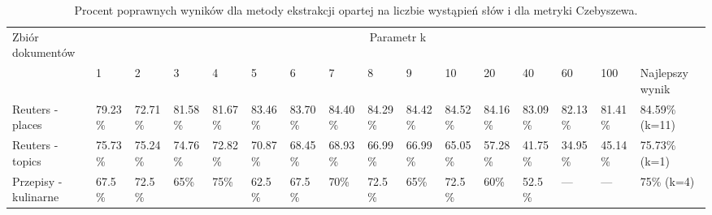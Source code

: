 \documentclass{classrep}
\begin{document}
\begingroup
{\scriptsize  
\setlength{\LTleft}{-20cm plus -1fill}
\setlength{\LTright}{\LTleft}

\begin{longtable}{|p{1cm}|p{0.7cm}|p{0.7cm}|p{0.7cm}|p{0.7cm}|p{0.7cm}|p{0.7cm}|p{0.7cm}|p{0.7cm}|p{0.7cm}|p{0.7cm}|p{0.7cm}|p{0.7cm}|p{0.7cm}|p{0.7cm}|p{1.1cm}|}
\caption{ Procent poprawnych wyników dla metody ekstrakcji opartej na liczbie wystąpień słów i dla metryki Czebyszewa.}\\ 
\hline

Zbiór
dokumentów

 &\multicolumn{15}{c|}{Parametr k}\\
\cline{2-16}
& 1
& 2
& 3
& 4
& 5
& 6
& 7
& 8
& 9
& 10
& 20
& 40
& 60
& 100
& Najlepszy wynik
\\ \hline\hline
Reuters
- places
& 79.23\%	%
& 72.71\%	%
& 81.58\%	%
& 81.67\%	%
& 83.46\%	%
& 83.70\%	%
& 84.40\%	%
& 84.29\%	%
& 84.42\%	%
& 84.52\%	%
& 84.16\%	%
& 83.09\%	%
& 82.13\%	%
& 81.41\%	%
& 84.59\% (k=11)
\\ \hline
Reuters
- topics
& 75.73\%	%
& 75.24\%	%
& 74.76\%	%
& 72.82\%	%
& 70.87\%	%
& 68.45\%	%
& 68.93\%	%
& 66.99\%	%
& 66.99\%	%
& 65.05\%	%
& 57.28\%	%
& 41.75\%	%
& 34.95\%	%
& 45.14\%	%
& 75.73\%	(k=1)
\\ \hline
Przepisy
- kulinarne 
& 67.5\%	%
& 72.5\%	%
& 65\%		%
& 75\%		%
& 62.5\%	%
& 67.5\%	%
& 70\%		%
& 72.5\%	%
& 65\%		%
& 72.5\%	%
& 60\%		%
& 52.5\%	%
& ---		%
& ---		%
& 75\% (k=4)
\\ \hline
\end{longtable}
}
\endgroup




\end{document}
